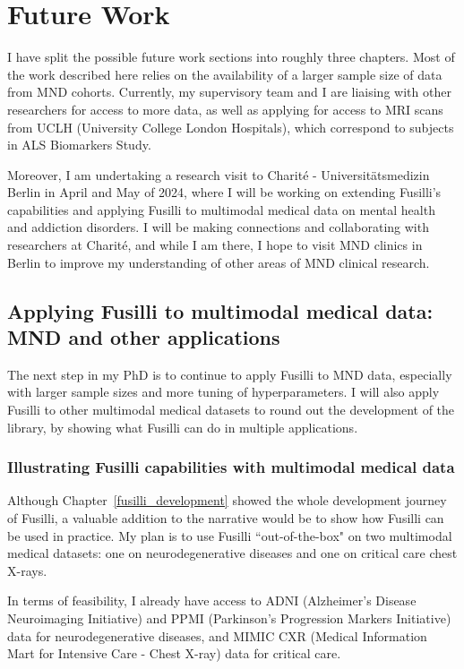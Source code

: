 \section{Future Work}

I have split the possible future work sections into roughly three chapters.
Most of the work described here relies on the availability of a larger sample size of data from MND cohorts.
Currently, my supervisory team and I are liaising with other researchers for access to more data, as well as applying for access to MRI scans from UCLH (University College London Hospitals), which correspond to subjects in ALS Biomarkers Study.

Moreover, I am undertaking a research visit to Charité - Universitätsmedizin Berlin in April and May of 2024, where I will be working on extending Fusilli's capabilities and applying Fusilli to multimodal medical data on mental health and addiction disorders.
I will be making connections and collaborating with researchers at Charité, and while I am there, I hope to visit MND clinics in Berlin to improve my understanding of other areas of MND clinical research.

\subsection{Applying Fusilli to multimodal medical data: MND and other applications}

The next step in my PhD is to continue to apply Fusilli to MND data, especially with larger sample sizes and more tuning of hyperparameters.
I will also apply Fusilli to other multimodal medical datasets to round out the development of the library, by showing what Fusilli can do in multiple applications.

\subsubsection*{Illustrating Fusilli capabilities with multimodal medical data}

Although Chapter~\ref{fusilli_development} showed the whole development journey of Fusilli, a valuable addition to the narrative would be to show how Fusilli can be used in practice.
My plan is to use Fusilli ``out-of-the-box" on two multimodal medical datasets: one on neurodegenerative diseases and one on critical care chest X-rays.

In terms of feasibility, I already have access to ADNI (Alzheimer's Disease Neuroimaging Initiative) and PPMI (Parkinson's Progression Markers Initiative) data for neurodegenerative diseases, and MIMIC CXR (Medical Information Mart for Intensive Care - Chest X-ray) data for critical care.

